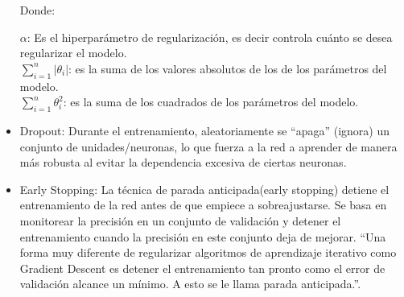 \begin{itemize}
Donde: 
		
		$\alpha $: Es el hiperparámetro de regularización, es decir controla cuánto se desea regularizar el modelo.\\
		$\sum_{i=1}^{n} \left |  \theta_i \right | $:  es la suma de los valores absolutos de los de los parámetros del modelo.\\
		$\sum_{i=1}^{n} \theta_i^2 $: es la suma de los cuadrados de los parámetros del modelo.\\
		
	\item Dropout: Durante el entrenamiento, aleatoriamente se ``apaga'' (ignora) un conjunto de unidades/neuronas, lo que fuerza a la red a aprender de manera más robusta al evitar la dependencia excesiva de ciertas neuronas.
	
	\item Early Stopping:  La técnica de parada anticipada(early stopping) detiene el entrenamiento de la red antes de que empiece a sobreajustarse. Se basa en monitorear la precisión en un conjunto de validación y detener el entrenamiento cuando la precisión en este conjunto deja de mejorar. ``Una forma muy diferente de regularizar algoritmos de aprendizaje iterativo como Gradient Descent es detener el entrenamiento tan pronto como el error de validación alcance un mínimo. A esto se le llama parada anticipada.''\cite[p. 142]{geron2019hands}.
	
\end{itemize}